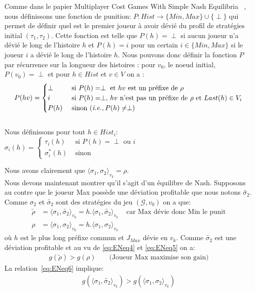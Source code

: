 \begin{demonstration}
\begin{itemize}
		
		Comme dans le papier \og Multiplayer Cost Games With Simple Nash Equilibria \fg~\cite{DBLP:conf/lfcs/BrihayePS13}, nous définissons une fonction de punition: $P : Hist \rightarrow \{ Min, Max \}\cup \{ \perp \}$ qui permet de définir quel est le premier joueur à avoir dévié du profil de stratégies initial $(\tau_1, \tau_2)$. Cette fonction est telle que $P(h) = \perp$ si aucun joueur n'a dévié le long de l'histoire $h$ et $P(h) = i$ pour un certain $i \in \{ Min, Max \}$ si le joueur $i$ a dévié le long de l'histoire $h$. Nous pouvons donc définir la fonction $P$ par récurrence sur la longueur des histoires : pour $v_0$, le noeud initial, $P(v_0) = \perp$  et pour $h \in Hist$ et $v\in V$ on a :
		$$
		P(hv) = \begin{cases}
				\perp & \text{ si } P(h) = \perp \text{ et } hv \text{ est un préfixe de } \rho \\
				i & \text{ si } P(h) = \perp ,\, hv \text{ n'est pas un préfixe de }\rho \text{ et } Last(h)\in V_i\\
				P(h) & \text{ sinon (\emph{i.e.,}}\, P(h)\neq \perp) \end{cases}
		$$\\
		
		Nous définissons pour tout $h \in Hist_{i}$:
		$\sigma_i(h) = \begin{cases} \tau_i(h) & \text{ si } P(h) = \perp \text{ ou } i \\
		\sigma_i^*(h) & \text{ sinon}
		
		\end{cases}$
		
		Nous avons clairement que $\langle \sigma_1, \sigma_2 \rangle_{v_{k}} = \rho$.\\
		Nous devons maintenant montrer qu'il s'agit d'un équilibre de Nash.
		Supposons au contre que le joueur Max possède une déviation profitable que nous notons $\tilde{\sigma_{2}}$. Comme $\sigma_2$ et $\tilde{\sigma_2}$ sont des stratégies du jeu $(\mathcal{G}, v_0)$ on a que:
		\begin{align} \tilde{\rho} &= \langle \sigma_1, \tilde{\sigma_2} \rangle_{v_0} 
								   = h. \langle \sigma_1, \tilde{\sigma_2} \rangle_{v_k} & \text{ car Max dévie donc Min le punit} \label{eq:ENeq4} \\
								\rho &= \langle \sigma_1, \sigma_2 \rangle_{v_0} 
								     = h. \langle \sigma_1, \sigma_2 \rangle_{v_k} \label{eq:ENeq5}
								\end{align} 
	où $h$ est le plus long préfixe commun et $J_{Max}$ dévie en $v_k$.
	Comme $\tilde{\sigma_2}$ est une déviation profitable et au vu de \eqref{eq:ENeq4} et \eqref{eq:ENeq5} on a:
	\begin{align}
		g(\tilde{\rho}) > g(\rho) && \text{ (Joueur Max maximise son gain}) \label{eq:ENeq6}
	\end{align}
	La relation~\eqref{eq:ENeq6} implique:
	\begin{align}
		g(\langle \sigma_1, \tilde{\sigma_2} \rangle _{v_k}) > g(\langle \sigma_1, \sigma_2 \rangle _{v_k})  \label{eq:ENeq7}
	\end{align}
	

\end{itemize}
\end{demonstration}
